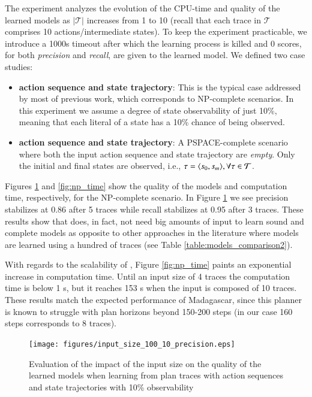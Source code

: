 The experiment analyzes the evolution of the CPU-time and quality of the learned models as $|\mathcal{T}|$ increases from 1 to 10 (recall that each trace in $\mathcal{T}$ comprises 10 actions/intermediate states). To keep the experiment practicable, we introduce a 1000s timeout after which the learning process is killed and $0$ scores, for both {\em precision} and {\em recall}, are given to the learned model. We defined two case studies:
\begin{itemize}
	\item \textbf{\FO action sequence and \PO state trajectory}: This is the typical case addressed by most of previous work, which corresponds to NP-complete scenarios. In this experiment we assume a degree of state observability of just 10\%, meaning that each literal of a state has a 10\% chance of being observed.
	\item  \textbf{\NO action sequence and \NO state trajectory}: A PSPACE-complete scenario where both the input action sequence and state trajectory are {\em empty}. Only the initial and final states are observed, i.e., $\tau = {\langle s_0, s_m \rangle}, \forall \tau \in \mathcal{T}$.
\end{itemize}

Figures \ref{fig:np_quality} and \ref{fig:np_time} show the quality of the models and computation time, respectively, for the NP-complete scenario. In Figure \ref{fig:np_quality} we see precision stabilizes at 0.86 after 5 traces while recall stabilizes at 0.95 after 3 traces. These results show that \FAMA does, in fact, not need big amounts of input to learn sound and complete models as opposite to other approaches in the literature where models are learned using a hundred of traces (see Table \ref{table:models_comparison2}).

With regards to the scalability of \FAMA, Figure \ref{fig:np_time} paints an exponential increase in computation time. Until an input size of 4 traces the computation time is below 1 s, but it reaches 153 s when the input is composed of 10 traces. These results match the expected performance of {\sc Madagascar}, since this planner is known to struggle with plan horizons beyond 150-200 steps (in our case 160 steps corresponds to 8 traces).

\begin{figure}[hbt!]
	\centering
	\texttt{[image: figures/input\_size\_100\_10\_precision.eps]}
	\caption{Evaluation of the impact of the input size on the quality of the learned models when learning from plan traces with \FO action sequences and \PO state trajectories with 10\% observability}
	\label{fig:np_quality}
\end{figure}

